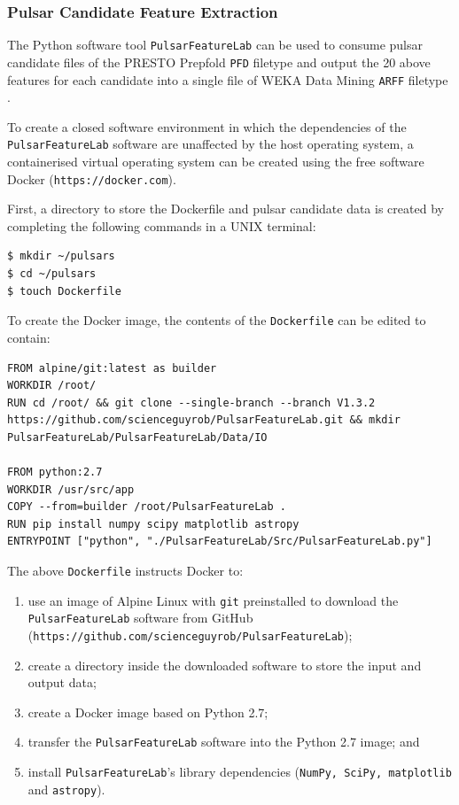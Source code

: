 \documentclass{article}
\begin{document}
\subsubsection{Pulsar Candidate Feature Extraction}

The Python software tool \verb|PulsarFeatureLab| can be used to consume pulsar candidate files of the PRESTO Prepfold \verb|PFD| filetype and output the 20 above features for each candidate into a single file of WEKA Data Mining \verb|ARFF| filetype \autocite{lyon}.

To create a closed software environment in which the dependencies of the \verb|PulsarFeatureLab| software are unaffected by the host operating system, a containerised virtual operating system can be created using the free software Docker (\verb|https://docker.com|).

First, a directory to store the Dockerfile and pulsar candidate data is created by completing the following commands in a UNIX terminal:

\begin{lstlisting}[numbers=none]
$ mkdir ~/pulsars
$ cd ~/pulsars
$ touch Dockerfile
\end{lstlisting}

To create the Docker image, the contents of the \verb|Dockerfile| can be edited to contain:

\begin{lstlisting}[title=Dockerfile]
FROM alpine/git:latest as builder
WORKDIR /root/
RUN cd /root/ && git clone --single-branch --branch V1.3.2 https://github.com/scienceguyrob/PulsarFeatureLab.git && mkdir PulsarFeatureLab/PulsarFeatureLab/Data/IO

FROM python:2.7
WORKDIR /usr/src/app
COPY --from=builder /root/PulsarFeatureLab .
RUN pip install numpy scipy matplotlib astropy
ENTRYPOINT ["python", "./PulsarFeatureLab/Src/PulsarFeatureLab.py"]
\end{lstlisting}

The above \verb|Dockerfile| instructs Docker to:
\begin{enumerate}[label=\roman*.]
    \item use an image of Alpine Linux with \verb|git| preinstalled to download the \verb|PulsarFeatureLab| software from GitHub \\(\verb|https://github.com/scienceguyrob/PulsarFeatureLab|);
    \item create a directory inside the downloaded software to store the input and output data;
    \item create a Docker image based on Python 2.7;
    \item transfer the \verb|PulsarFeatureLab| software into the Python 2.7 image; and
    \item install \verb|PulsarFeatureLab|'s library dependencies (\verb|NumPy, SciPy, matplotlib| and \verb|astropy|).
\end{enumerate}
\end{document}
